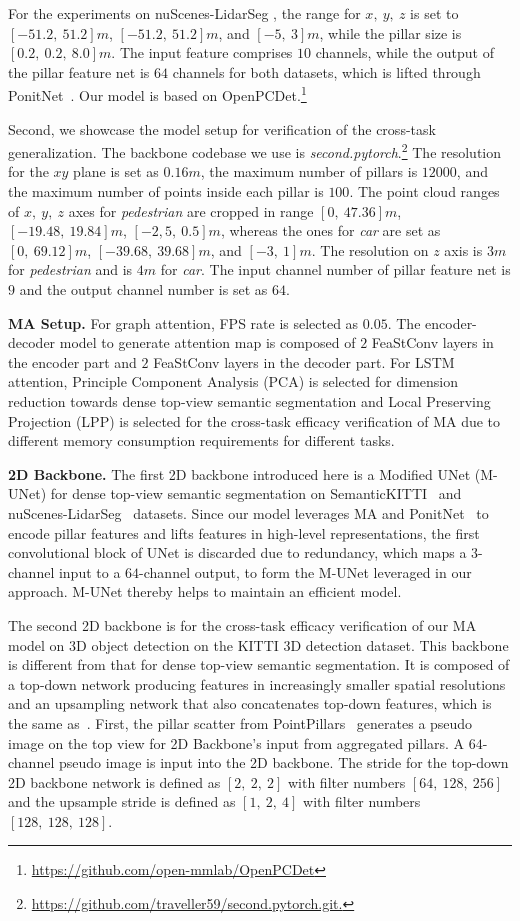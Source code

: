 \documentclass[lettersize,journal]{IEEEtran}
\begin{document}
For the experiments on nuScenes-LidarSeg \cite{nuscenes}, the range for $x,~y,~z$ is set to $[-51.2, ~51.2]m$, $[-51.2,~51.2]m$, and $[-5,~3]m$, while the pillar size is $[0.2,~0.2,~8.0]m$. The input feature comprises $10$ channels, while the output of the pillar feature net is $64$ channels for both datasets, which is lifted through PonitNet~\cite{pointnet}. Our model is based on OpenPCDet.\footnote{\url{https://github.com/open-mmlab/OpenPCDet}}

Second, we showcase the model setup for verification of the cross-task generalization.
The backbone codebase we use is \textit{second.pytorch}.\footnote{\url{https://github.com/traveller59/second.pytorch.git.}}
The resolution for the $xy$ plane is set as $0.16 m$, the maximum number of pillars is $12000$, and the maximum number of points inside each pillar is $100$. The point cloud ranges of $x,~y,~z$ axes for \emph{pedestrian} are cropped in range $[0,~47.36]m$, $[-19.48,~19.84]m$, $[-2,5,~0.5]m$, whereas the ones for \emph{car} are set as $[0,~69.12]m$, $[-39.68,~39.68]m$, and $[-3,~1]m$.
The resolution on $z$ axis is $3 m$ for \emph{pedestrian} and is $4 m$ for \emph{car}. The input channel number of pillar feature net is $9$ and the output channel number is set as $64$.

\textbf{MA Setup.} 
For graph attention, FPS rate is selected as $0.05$. The encoder-decoder model to generate attention map is composed of $2$ FeaStConv layers in the encoder part and $2$ FeaStConv layers in the decoder part. For LSTM attention, Principle Component Analysis (PCA) is selected for dimension reduction towards dense top-view semantic segmentation and Local Preserving Projection (LPP) is selected for the cross-task efficacy verification of MA due to different memory consumption requirements for different tasks.

\textbf{2D Backbone.} The first 2D backbone introduced here is a Modified UNet (M-UNet) for dense top-view semantic segmentation on SemanticKITTI~\cite{semantic_kitti} and nuScenes-LidarSeg~\cite{nuscenes} datasets. Since our model leverages MA and PonitNet~\cite{pointnet} to encode pillar features and lifts features in high-level representations, the first convolutional block of UNet is discarded due to redundancy, which maps a $3$-channel input to a $64$-channel output, to form the M-UNet leveraged in our approach. M-UNet thereby helps to maintain an efficient model.

The second 2D backbone is for the cross-task efficacy verification of our MA model on 3D object detection on the KITTI 3D detection dataset. This backbone is different from that for dense top-view semantic segmentation. It is composed of a top-down network producing features in increasingly smaller spatial resolutions and an upsampling network that also concatenates top-down features, which is the same as~\cite{pointpillars}.
First, the pillar scatter from PointPillars~\cite{pointpillars} generates a pseudo image on the top view for 2D Backbone's input from aggregated pillars.
A $64$-channel pseudo image is input into the 2D backbone.
The stride for the top-down 2D backbone network is defined as $[2,~2,~2]$ with filter numbers $[64,~128,~256]$ and the upsample stride is defined as $[1,~2,~4]$ with filter numbers $[128,~128,~128]$.
\end{document}
